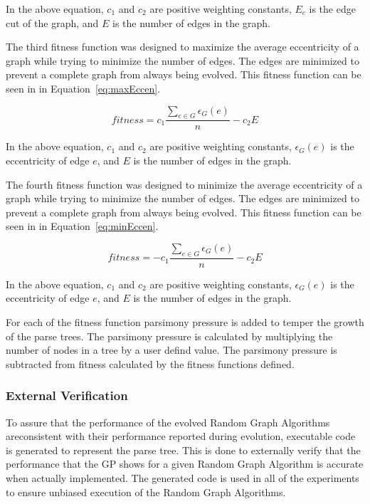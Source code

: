 \documentclass{article}
\begin{document}
In the above equation, $c_1$ and $c_2$ are positive weighting constants, $E_c$ is the edge cut of the graph, and $E$ is the number of edges in the graph.



The third fitness function was designed to maximize the average eccentricity of a graph while trying to minimize the number of edges. The edges are minimized
to prevent a complete graph from always being evolved. This fitness function can be seen in in Equation~\ref{eq:maxEccen}.


\begin{equation}
\label{eq:maxEccen}
fitness = c_1\frac{\sum\limits_{e \in G}\epsilon_{G}(e)}{n} - c_2E
\end{equation}

In the above equation, $c_1$ and $c_2$ are positive weighting constants, $\epsilon_{G}(e)$ is the eccentricity of edge $e$, and $E$ is the number of edges in the graph.


The fourth fitness function was designed to minimize the average eccentricity of a graph while trying to minimize the number of edges. The edges are minimized to 
prevent a complete graph from always being evolved. This fitness function
can be seen in in Equation~\ref{eq:minEccen}.


\begin{equation}
\label{eq:minEccen}
fitness = -c_1\frac{\sum\limits_{e \in G}\epsilon_{G}(e)}{n} - c_2E
\end{equation}

In the above equation, $c_1$ and $c_2$ are positive weighting constants, $\epsilon_{G}(e)$ is the eccentricity of edge $e$, and $E$ is the number of edges in the graph.

For each of the fitness function parsimony pressure is added to temper the growth of the parse trees. The parsimony pressure is calculated by multiplying the number
of nodes in a tree by a user defind value. The parsimony pressure is subtracted from fitness calculated by the fitness functions defined.

\subsubsection{External Verification}
To assure that the performance of the evolved Random Graph Algorithms areconsistent with their performance reported during evolution,
executable code is generated to represent the parse tree. This is done to externally verify that the performance that the GP shows for a
given Random Graph Algorithm is accurate when actually implemented. The generated code is used in all of the experiments to ensure unbiased execution 
of the Random Graph Algorithms.
\end{document}
